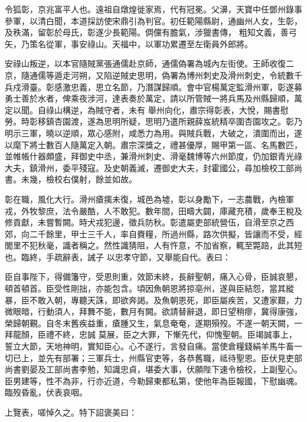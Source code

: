 \begin{pinyinscope}
 令狐彰，京兆富平人也。遠祖自燉煌徙家焉，代有冠冕。父濞，天寶中任鄧州錄事參軍，以清白聞，本道採訪使宋鼎引為判官。初任範陽縣尉，通幽州人女，生彰，及秩滿，留彰於母氏，彰遂少長範陽。倜儻有膽氣，涉獵書傳，
 粗知文義，善弓矢，乃策名從軍，事安祿山。天福中，以軍功累遷至左衛員外郎將。



 安祿山叛逆，以本官隨賊黨張通儒赴京師，通儒偽署為城內左街使。王師收復二京，隨通儒等遁走河朔，又陷逆賊史思明，偽署為博州刺史及滑州刺史，令統數千兵戍滑臺。彰感激忠義，思立名節，乃潛謀歸順。會中官楊萬定監滑州軍，彰遂募勇士善於水者，俾乘夜涉河，達表奏於萬定，請以所管賊一將兵馬及州縣歸順，萬定以聞。自祿山構逆，為賊守者，未有
 舉州向化，肅宗得彰表，大悅，賜書慰勞。時彰移鎮杏園渡，遂為思明所疑，思明乃遣所親薛岌統精卒圍杏園攻之。彰乃明示三軍，曉以逆順，眾心感附，咸悉力為用。與賊兵戰，大破之，潰圍而出，遂以麾下將士數百人隨萬定入朝。肅宗深獎之，禮甚優厚，賜甲第一區、名馬數匹，並帷帳什器頗盛，拜御史中丞，兼滑州刺史、滑毫魏博等六州節度，仍加銀青光祿大夫，鎮滑州，委平殘寇。及史朝義滅，遷御史大夫，封霍國公，尋加檢校工部尚
 書。未幾，檢校右僕射，餘並如故。



 彰在職，風化大行。滑州瘡痍未復，城邑為墟，彰以身勵下，一志農戰，內檢軍戎，外牧黎庶，法令嚴酷，人不敢犯。數年間，田疇大闢，庫藏充積，歲奉王稅及修貢獻，未嘗暫闕。時犬戎犯邊，徵兵防秋。彰遣屬吏部統營伍，自滑至京之西郊，向二千餘里，甲士三千人，率自賚糧，所過州縣，路次供擬，皆讓而不受，經閭里不犯秋毫，識者稱之。然性識猜阻，人有忤意，不加省察，輒至斃踣，此其短也。臨終，手疏辭表，誡子
 以忠孝守節，又舉能自代。表曰：



 臣自事陛下，得備籓守，受恩則重，效節未終，長辭聖朝，痛入心骨，臣誠哀懇，頓首頓首。臣受性剛拙，亦能包含。頃因魚朝恩將掠亳州，遂與臣結怨，當其縱暴，臣不敢入朝，專聽天誅，即欲奔謁。及魚朝恩死，即臣屬疾苦，又遭家艱，力微眼暗，行動須人，拜舞不能，數月有闕。欲請替辭退，即日望稍瘳，冀得康強，榮歸朝覲。自冬末舊疾益重，瘡腫又生，氣息奄奄，遂期殞歿。不遂一朝天闕，一拜龍顏，臣禮不終，忠誠
 莫展，臣之大罪，下慚先代，仰愧聖朝。臣竭誠事上，誓立大節，天地神明，實知臣心。心不遂行，言發自痛。當使倉糧錢絹羊馬牛畜一切已上，並先有部署；三軍兵士，州縣官吏等，各恭舊職，祗待聖恩。臣伏見吏部尚書劉晏及工部尚書李勉，知識忠貞，堪委大事，伏願陛下速令檢校，上副聖心。臣男建等，性不為非，行亦近道，今勒歸東都私第，使他年為臣報國，下慰幽魂。臨歿昏亂，伏表哀咽。



 上覽表，嗟悼久之。特下詔褒美曰：




\end{pinyinscope}
